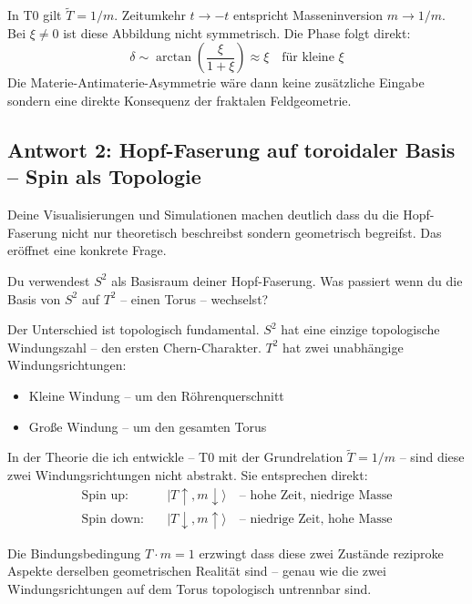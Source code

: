 \documentclass[12pt, a4paper]{article}
\newcommand{\xipar}{\xi}
\newcommand{\Tfield}{\tilde{T}}
\begin{document}
In T0 gilt $\Tfield = 1/m$. Zeitumkehr $t \to -t$ entspricht Masseninversion $m \to 1/m$. Bei $\xipar \neq 0$ ist diese Abbildung nicht symmetrisch. Die Phase folgt direkt:
\begin{equation}
  \delta \sim \arctan\!\left(\frac{\xipar}{1+\xipar}\right) \approx \xipar \quad \text{für kleine } \xipar
\end{equation}
Die Materie-Antimaterie-Asymmetrie wäre dann keine zusätzliche Eingabe sondern eine direkte Konsequenz der fraktalen Feldgeometrie.

\subsection{Antwort 2: Hopf-Faserung auf toroidaler Basis -- Spin als Topologie}

\begin{response}
Deine Visualisierungen und Simulationen machen deutlich dass du die Hopf-Faserung nicht nur theoretisch beschreibst sondern geometrisch begreifst. Das eröffnet eine konkrete Frage.

Du verwendest $S^2$ als Basisraum deiner Hopf-Faserung. Was passiert wenn du die Basis von $S^2$ auf $T^2$ -- einen Torus -- wechselst?

Der Unterschied ist topologisch fundamental. $S^2$ hat eine einzige topologische Windungszahl -- den ersten Chern-Charakter. $T^2$ hat zwei unabhängige Windungsrichtungen:
\begin{itemize}[noitemsep]
  \item Kleine Windung -- um den Röhrenquerschnitt
  \item Große Windung -- um den gesamten Torus
\end{itemize}

In der Theorie die ich entwickle -- T0 mit der Grundrelation $\Tfield = 1/m$ -- sind diese zwei Windungsrichtungen nicht abstrakt. Sie entsprechen direkt:
\begin{align}
  \text{Spin up:} \quad &|T{\uparrow}, m{\downarrow}\rangle \quad \text{-- hohe Zeit, niedrige Masse} \\
  \text{Spin down:} \quad &|T{\downarrow}, m{\uparrow}\rangle \quad \text{-- niedrige Zeit, hohe Masse}
\end{align}

Die Bindungsbedingung $T \cdot m = 1$ erzwingt dass diese zwei Zustände reziproke Aspekte derselben geometrischen Realität sind -- genau wie die zwei Windungsrichtungen auf dem Torus topologisch untrennbar sind.


\end{response}
\end{document}
